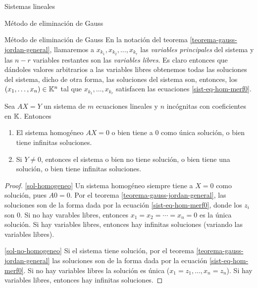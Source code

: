 \begin{chapter}{Sistemas lineales}
\begin{section}{Método de eliminación de Gauss }
\begin{subsection}{Método de eliminación de Gauss}
    En la notación del teorema \ref{teorema-gauss-jordan-general}, llamaremos a  $x_{k_1}, x_{k_2}, \ldots, x_{k_r}$ las \textit{variables principales} del sistema  y  las $n-r$ variables restantes son las \textit{variables libres}. Es claro entonces que dándoles valores arbitrarios a las variables libres obtenemos todas las soluciones del sistema, dicho de otra forma, las soluciones del sistema son, entonces,  los $(x_1,\ldots,x_n)\in \mathbb K^n$ tal que $x_{k_1},\ldots,x_{k_r}$ satisfacen las ecuaciones \eqref{sist-eq-hom-merf0}.

    \begin{teorema}\label{inf-sol-var-libres}
        Sea $AX=Y$ un sistema de $m$ ecuaciones lineales y $n$ incógnitas con coeficientes en $\mathbb K$. Entonces
        \begin{enumerate}
            \item\label{sol-homogeneo} El sistema homogéneo $AX=0$ o bien tiene a $0$ como única solución,  o bien tiene infinitas soluciones. 
            \item\label{sol-no-homogeneo} Si $Y \ne 0$,  entonces el sistema  o bien no tiene solución, o bien tiene una solución, o bien tiene infinitas soluciones. 
        \end{enumerate} 
    \end{teorema}
    \begin{proof}
        \ref{sol-homogeneo}  Un  sistema homogéneo siempre tiene a $X=0$ como solución, pues $A0 =0$. Por el teorema \ref{teorema-gauss-jordan-general},  las soluciones son de la forma dada por la ecuación \eqref{sist-eq-hom-merf0}, donde los $z_i$ son $0$. Si  no hay varables libres, entonces $x_1=x_2= \cdots =x_n =0$ es la única solución. Si hay variables libres,  entonces hay infinitas soluciones (variando las variables libres).  
        
        \ref{sol-no-homogeneo} Si el  sistema tiene solución, por el teorema \ref{teorema-gauss-jordan-general} las soluciones son de la forma dada por la ecuación \eqref{sist-eq-hom-merf0}. Si  no hay variables libres la solución es única ($x_1=z_1,\ldots,x_n =z_n$). Si hay variables libres,  entonces hay infinitas soluciones.   
    \end{proof}
    

\end{subsection}
\end{section}
\end{chapter}
